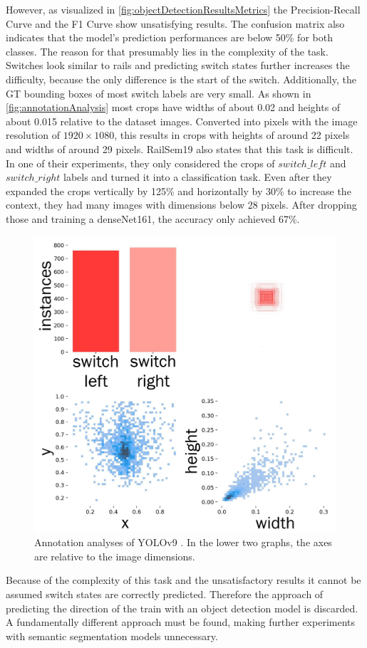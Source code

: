\noindent However, as visualized in \autoref{fig:objectDetectionResultsMetrics} the Precision-Recall Curve and the F1 Curve show unsatisfying results.
The confusion matrix also indicates that the model's prediction performances are below 50\% for both classes.
The reason for that presumably lies in the complexity of the task.
Switches look similar to rails and predicting switch states further increases the difficulty, because the only difference is the start of the switch.
Additionally, the \ac{GT} bounding boxes of most switch labels are very small.
As shown in \autoref{fig:annotationAnalysis} most crops have widths of about 0.02 and heights of about 0.015 relative to the dataset images.
Converted into pixels with the image resolution of $1920 \times 1080$, this results in crops with heights of around 22 pixels and widths of around 29 pixels.
RailSem19 \cite{railsem19dataset} also states that this task is difficult.
In one of their experiments, they only considered the crops of $switch\_left$ and $switch\_right$ labels and turned it into a classification task.
Even after they expanded the crops vertically by 125\% and horizontally by 30\% to increase the context, they had many images with dimensions below 28 pixels.
After dropping those and training a denseNet161, the accuracy only achieved 67\%.

\begin{figure}[H]
    \centering
    \includegraphics[width=0.6\linewidth]{PICs/experiments/objectdetectionExperiment/labels_updated.jpg}
    \caption{Annotation analyses of \ac{YOLO}v9 \cite{YOLOv9GitHub}. In the lower two graphs, the axes are relative to the image dimensions.}
    \label{fig:annotationAnalysis}
\end{figure}

\noindent Because of the complexity of this task and the unsatisfactory results it cannot be assumed switch states are correctly predicted.
Therefore the approach of predicting the direction of the train with an object detection model is discarded.
A fundamentally different approach must be found, making further experiments with semantic segmentation models unnecessary.